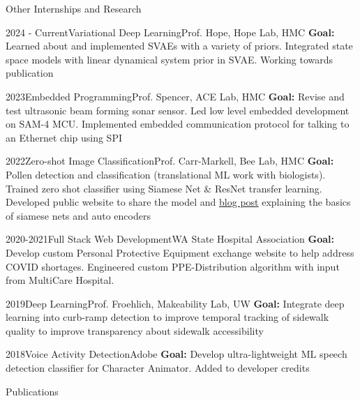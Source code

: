 \documentclass[]{mcdowellcv}
\begin{document}
\begin{cvsection}{Other Internships and Research}
	\begin{cvsubsection}{2024 - Current}{Variational Deep Learning}{Prof. Hope, Hope Lab, HMC}
		\textbf{Goal:} Learned about and implemented SVAEs with a variety of priors. Integrated state space models with linear dynamical system prior in SVAE. Working towards publication
	\end{cvsubsection}
	\begin{cvsubsection}{2023}{Embedded Programming}{Prof. Spencer, ACE Lab, HMC}
		\textbf{Goal:}  Revise and test ultrasonic beam forming sonar sensor. Led low level embedded development on SAM-4 MCU. Implemented embedded
		communication protocol for talking to an Ethernet chip using SPI
	\end{cvsubsection}
	\begin{cvsubsection}{2022}{Zero-shot Image Classification}{Prof. Carr-Markell, Bee Lab, HMC}
		\textbf{Goal:} Pollen detection and classification (translational ML work with biologists). Trained zero shot classifier using Siamese Net \& ResNet transfer learning. Developed public website to share the model and \href{https://hmcbee.blogspot.com/2022/12/blue-bees-twin-neural-networks-and-more.html}{blog post} explaining the basics of siamese nets and auto encoders
	\end{cvsubsection}
	\begin{cvsubsection}{2020-2021}{Full Stack Web Development}{WA State Hospital Association}
		\textbf{Goal:} Develop custom Personal Protective Equipment exchange website to help address COVID shortages. Engineered custom PPE-Distribution algorithm with input from  MultiCare Hospital.
	\end{cvsubsection}
	\begin{cvsubsection}{2019}{Deep Learning}{Prof. Froehlich, Makeability Lab, UW}
		\textbf{Goal:} Integrate deep learning into curb-ramp detection to improve temporal tracking of sidewalk quality to improve transparency about sidewalk accessibility
	\end{cvsubsection}

	\begin{cvsubsection}{2018}{Voice Activity Detection}{Adobe}
		\textbf{Goal:} Develop ultra-lightweight ML speech detection classifier for Character Animator. Added to developer credits
	\end{cvsubsection}
\end{cvsection}
\newpage
\begin{cvsection}{Publications}

	

\end{cvsection}
\end{document}
